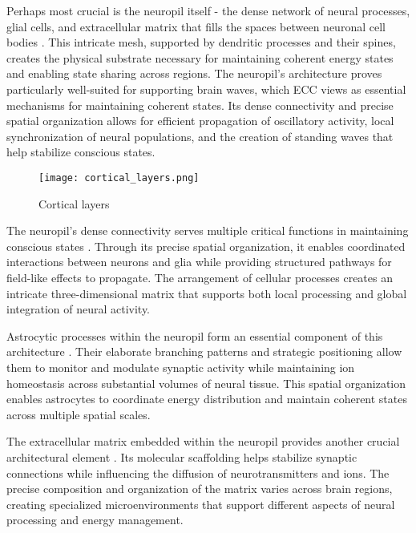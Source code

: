 Perhaps most crucial is the neuropil itself - the dense network of neural processes, glial cells, and extracellular matrix that fills the spaces between neuronal cell bodies \cite{Kasthuri2015}. This intricate mesh, supported by dendritic processes and their spines, creates the physical substrate necessary for maintaining coherent energy states and enabling state sharing across regions. The neuropil's architecture proves particularly well-suited for supporting brain waves, which ECC views as essential mechanisms for maintaining coherent states. Its dense connectivity and precise spatial organization allows for efficient propagation of oscillatory activity, local synchronization of neural populations, and the creation of standing waves that help stabilize conscious states.

\begin{figure}[h]
    \centering
    \texttt{[image: cortical\_layers.png]}

    \caption{Cortical layers}
\end{figure}

The neuropil's dense connectivity serves multiple critical functions in maintaining conscious states \cite{Kasthuri2015}. Through its precise spatial organization, it enables coordinated interactions between neurons and glia while providing structured pathways for field-like effects to propagate. The arrangement of cellular processes creates an intricate three-dimensional matrix that supports both local processing and global integration of neural activity.

Astrocytic processes within the neuropil form an essential component of this architecture \cite{Peters1984}. Their elaborate branching patterns and strategic positioning allow them to monitor and modulate synaptic activity while maintaining ion homeostasis across substantial volumes of neural tissue. This spatial organization enables astrocytes to coordinate energy distribution and maintain coherent states across multiple spatial scales.

The extracellular matrix embedded within the neuropil provides another crucial architectural element \cite{Braitenberg1998}. Its molecular scaffolding helps stabilize synaptic connections while influencing the diffusion of neurotransmitters and ions. The precise composition and organization of the matrix varies across brain regions, creating specialized microenvironments that support different aspects of neural processing and energy management.

